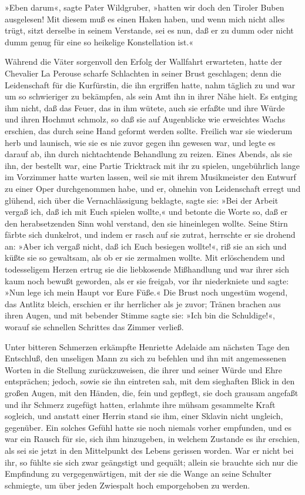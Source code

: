 \pagenum{[115]} »Eben darum«, sagte Pater Wildgruber, »hatten wir
doch den Tiroler Buben ausgelesen! Mit diesem muß es einen Haken
haben, und wenn mich nicht alles trügt, sitzt derselbe in seinem
Verstande, sei es nun, daß er zu dumm oder nicht dumm genug für
eine so heikelige Konstellation ist.«

Während die Väter sorgenvoll den Erfolg der Wallfahrt erwarteten,
hatte der Chevalier La Perouse scharfe Schlachten in seiner Brust
geschlagen; denn die Leidenschaft für die Kurfürstin, die ihn
ergriffen hatte, nahm täglich zu und war um so schwieriger zu
bekämpfen, als sein Amt ihn in ihrer Nähe hielt. Es entging ihm
nicht, daß das Feuer, das in ihm wütete, auch sie erfaßte und ihre
Würde und ihren Hochmut schmolz, so daß sie auf Augenblicke wie
erweichtes Wachs erschien, das durch seine Hand geformt werden
sollte. Freilich war sie wiederum herb und launisch, wie sie es nie
zuvor gegen ihn gewesen war, und legte es darauf ab, ihn durch
nichtachtende Behandlung zu reizen. Eines Abends, als sie ihn, der
bestellt war, eine Partie Tricktrack mit ihr zu spielen,
ungebührlich lange im Vorzimmer hatte warten lassen, weil sie mit
ihrem Musikmeister den Entwurf zu einer Oper durchgenommen habe,
und er, ohnehin von Leidenschaft erregt und glühend, sich über die
Vernachlässigung beklagte, sagte sie: »Bei der Arbeit vergaß ich,
daß ich mit Euch spielen wollte,« und betonte die Worte so, daß er
den herabsetzenden Sinn wohl verstand, den sie hineinlegen wollte.
Seine Stirn färbte sich dunkelrot, und indem er rasch auf sie
zutrat, herrschte er sie drohend an: »Aber ich vergaß nicht, daß
ich Euch besiegen wollte!«, riß sie an sich und küßte sie so
gewaltsam, als ob er sie zermalmen wollte. Mit erlöschendem und
todesseligem Herzen ertrug sie die liebkosende Mißhandlung und war
ihrer sich kaum noch \pagenum{[116]} bewußt geworden, als er sie
freigab, vor ihr niederkniete und sagte: »Nun lege ich mein Haupt
vor Eure Füße.« Die Brust noch ungestüm wogend, das Antlitz bleich,
erschien er ihr herrlicher als je zuvor; Tränen brachen aus ihren
Augen, und mit bebender Stimme sagte sie: »Ich bin die Schuldige!«,
worauf sie schnellen Schrittes das Zimmer verließ.

Unter bitteren Schmerzen erkämpfte Henriette Adelaide am nächsten
Tage den Entschluß, den unseligen Mann zu sich zu befehlen und ihn
mit angemessenen Worten in die Stellung zurückzuweisen, die ihrer
und seiner Würde und Ehre entsprächen; jedoch, sowie sie ihn
eintreten sah, mit dem sieghaften Blick in den großen Augen, mit
den Händen, die, fein und gepflegt, sie doch grausam angefaßt und
ihr Schmerz zugefügt hatten, erlahmte ihre mühsam gesammelte Kraft
sogleich, und anstatt einer Herrin stand sie ihm, einer Sklavin
nicht ungleich, gegenüber. Ein solches Gefühl hatte sie noch
niemals vorher empfunden, und es war ein Rausch für sie, sich ihm
hinzugeben, in welchem Zustande es ihr erschien, als sei sie jetzt
in den Mittelpunkt des Lebens gerissen worden. War er nicht bei
ihr, so fühlte sie sich zwar geängstigt und gequält; allein sie
brauchte sich nur die Empfindung zu vergegenwärtigen, mit der sie
die Wange an seine Schulter schmiegte, um über jeden Zwiespalt hoch
emporgehoben zu werden.

